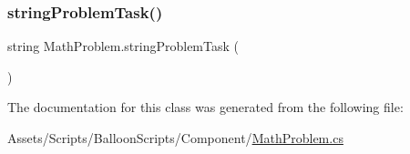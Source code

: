 \subsubsection{\texorpdfstring{string\+Problem\+Task()}{stringProblemTask()}}
{\footnotesize\ttfamily string Math\+Problem.\+string\+Problem\+Task (\begin{DoxyParamCaption}{ }\end{DoxyParamCaption})\hspace{0.3cm}{\ttfamily [inline]}}



The documentation for this class was generated from the following file\+:\begin{DoxyCompactItemize}
\item 
Assets/\+Scripts/\+Balloon\+Scripts/\+Component/\hyperlink{MathProblem_8cs}{Math\+Problem.\+cs}\end{DoxyCompactItemize}
